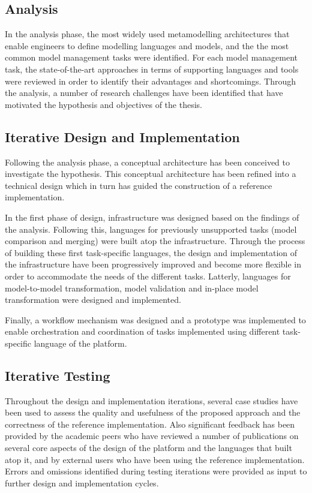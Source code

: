 \subsection{Analysis}

In the analysis phase, the most widely used metamodelling architectures that enable engineers to define modelling languages and models, and the the most common model management tasks were identified. For each model management task, the state-of-the-art approaches in terms of supporting languages and tools were reviewed in order to identify their advantages and shortcomings. Through the analysis, a number of research challenges have been identified that have motivated the hypothesis and objectives of the thesis.

\subsection{Iterative Design and Implementation}

Following the analysis phase, a conceptual architecture has been conceived to investigate the hypothesis. This conceptual architecture has been refined into a technical design which in turn has guided the construction of a reference implementation.
 
In the first phase of design, infrastructure was designed based on the findings of the analysis. Following this, languages for previously unsupported tasks (model comparison and merging) were built atop the infrastructure. Through the process of building these first task-specific languages, the design and implementation of the infrastructure have been progressively improved and become more flexible in order to accommodate the needs of the different tasks. Latterly, languages for model-to-model transformation, model validation and in-place model transformation were designed and implemented. 

Finally, a workflow mechanism was designed and a prototype was implemented to enable orchestration and coordination of tasks implemented using different task-specific language of the platform.

\subsection{Iterative Testing}

Throughout the design and implementation iterations, several case studies have been used to assess the quality and usefulness of the proposed approach and the correctness of the reference implementation. Also significant feedback has been provided by the academic peers who have reviewed a number of publications on several core aspects of the design of the platform and the languages that built atop it, and by external users who have been using the reference implementation. Errors and omissions identified during testing iterations were provided as input to further design and implementation cycles.

